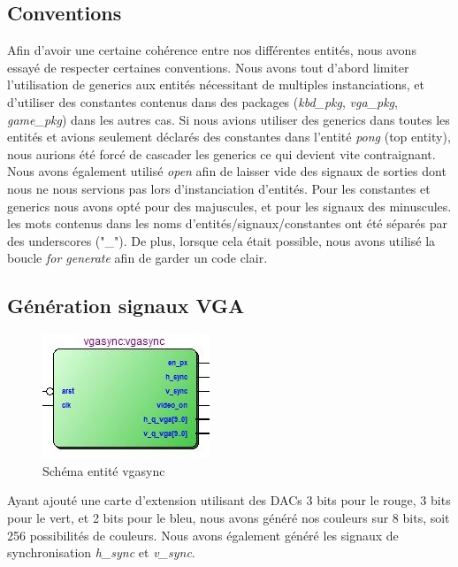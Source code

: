 \newpage
\subsection{Conventions}
Afin d'avoir une certaine cohérence entre nos différentes entités, nous avons essayé de respecter certaines conventions. Nous avons tout d'abord limiter l'utilisation de generics aux entités nécessitant de multiples instanciations, et d'utiliser des constantes contenus dans des packages (\emph{kbd\_pkg}, \emph{vga\_pkg}, \emph{game\_pkg}) dans les autres cas. Si nous avions utiliser des generics dans toutes les entités et avions seulement déclarés des constantes dans l'entité  \emph{pong} (top entity), nous aurions été forcé de cascader les generics ce qui devient vite contraignant.\\

Nous avons également utilisé \emph{open} afin de laisser vide des signaux de sorties dont nous ne nous servions pas lors d'instanciation d'entités. Pour les constantes et generics nous avons opté pour des majuscules, et pour les signaux des minuscules. les mots contenus dans les noms d'entités/signaux/constantes ont été séparés par des underscores ("\_"). De plus, lorsque cela était possible, nous avons utilisé la boucle \emph{for generate} afin de garder un code clair.

\newpage
\subsection{Génération signaux VGA}
\begin{figure}[h!]
	\centering
	\includegraphics{images/vgasync.jpg}
	\caption{Schéma entité vgasync}
	\label{fig:vgasync}
\end{figure}

Ayant ajouté une carte d'extension utilisant des DACs 3 bits pour le rouge, 3 bits pour le vert, et 2 bits pour le bleu, nous avons généré nos couleurs sur 8 bits, soit 256 possibilités de couleurs. Nous avons également généré les signaux de synchronisation \emph{h\_sync} et \emph{v\_sync}.\\

